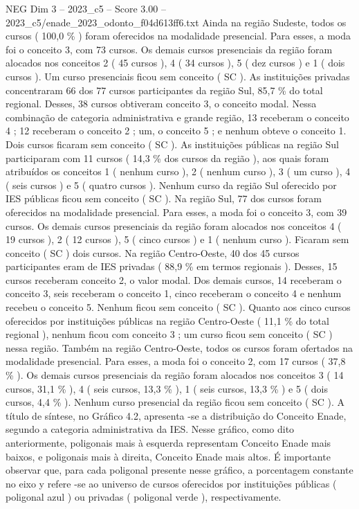 \begin{textsample}{NEG Dim 3 – 2023\_c5 – Score 3.00 – 2023\_c5/enade\_2023\_odonto\_f04d613ff6.txt}
Ainda na região Sudeste, todos os cursos ( 100,0 \% ) foram oferecidos na modalidade presencial.
Para esses, a moda foi o conceito 3, com 73 cursos.
Os demais cursos presenciais da região foram alocados nos conceitos 2 ( 45 cursos ), 4 ( 34 cursos ), 5 ( dez cursos ) e 1 ( dois cursos ).
Um curso presenciais ficou sem conceito ( SC ).
As instituições privadas concentraram 66 dos 77 cursos participantes da região Sul, 85,7 \% do total regional.
Desses, 38 cursos obtiveram conceito 3, o conceito modal.
Nessa combinação de categoria administrativa e grande região, 13 receberam o conceito 4 ; 12 receberam o conceito 2 ; um, o conceito 5 ; e nenhum obteve o conceito 1.
Dois cursos ficaram sem conceito ( SC ).
As instituições públicas na região Sul participaram com 11 cursos ( 14,3 \% dos cursos da região ), aos quais foram atribuídos os conceitos 1 ( nenhum curso ), 2 ( nenhum curso ), 3 ( um curso ), 4 ( seis cursos ) e 5 ( quatro cursos ).
Nenhum curso da região Sul oferecido por IES públicas ficou sem conceito ( SC ).
Na região Sul, 77 dos cursos foram oferecidos na modalidade presencial.
Para esses, a moda foi o conceito 3, com 39 cursos.
Os demais cursos presenciais da região foram alocados nos conceitos 4 ( 19 cursos ), 2 ( 12 cursos ), 5 ( cinco cursos ) e 1 ( nenhum curso ).
Ficaram sem conceito ( SC ) dois cursos.
Na região Centro-Oeste, 40 dos 45 cursos participantes eram de IES privadas ( 88,9 \% em termos regionais ).
Desses, 15 cursos receberam conceito 2, o valor modal.
Dos demais cursos, 14 receberam o conceito 3, seis receberam o conceito 1, cinco receberam o conceito 4 e nenhum recebeu o conceito 5.
Nenhum ficou sem conceito ( SC ).
Quanto aos cinco cursos oferecidos por instituições públicas na região Centro-Oeste ( 11,1 \% do total regional ), nenhum ficou com conceito 3 ; um curso ficou sem conceito ( SC ) nessa região.
Também na região Centro-Oeste, todos os cursos foram ofertados na modalidade presencial.
Para esses, a moda foi o conceito 2, com 17 cursos ( 37,8 \% ).
Os demais cursos presenciais da região foram alocados nos conceitos 3 ( 14 cursos, 31,1 \% ), 4 ( seis cursos, 13,3 \% ), 1 ( seis cursos, 13,3 \% ) e 5 ( dois cursos, 4,4 \% ).
Nenhum curso presencial da região ficou sem conceito ( SC ).
A título de síntese, no Gráfico 4.2, apresenta -se a distribuição do Conceito Enade, segundo a categoria administrativa da IES.
Nesse gráfico, como dito anteriormente, poligonais mais à esquerda representam Conceito Enade mais baixos, e poligonais mais à direita, Conceito Enade mais altos.
É importante observar que, para cada poligonal presente nesse gráfico, a porcentagem constante no eixo y refere -se ao universo de cursos oferecidos por instituições públicas ( poligonal azul ) ou privadas ( poligonal verde ), respectivamente.

\end{textsample}
